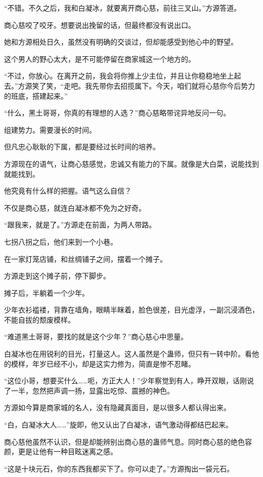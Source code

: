 \begin{this_body}
“不错。不久之后，我和白凝冰，就要离开商心慈，前往三叉山。”方源答道。

商心慈咬了咬牙。想要说出挽留的话，但最终都没有说出口。

她和方源相处日久，虽然没有明确的交谈过，但却能感受到他心中的野望。

这个男人的野心太大，是不可能停留在商家城这一个地方的。

“不过，你放心。在离开之前，我会将你推上少主位，并且让你稳稳地坐上起去。”方源笑了笑，“走吧。我先带你去招揽属下。今天，咱们就将心慈你今后势力的班底，搭建起来。”

“什么，黑土哥哥，你真的有理想的人选？”商心慈略带诧异地反问一句。

组建势力。需要漫长的时间。

但凡忠心耿耿的下属，都是要经过长时间的培养。

方源现在的语气，让商心慈感觉，忠诚又有能力的下属。就像是大白菜，说能找到就能找到。

他究竟有什么样的把握。语气这么自信？

不仅是商心慈，就连白凝冰都不免为之好奇。

“跟我来，就是了。”方源走在前面，为两人带路。

七拐八拐之后，他们来到一个小巷。

在一家灯笼店铺，和丝绸铺子之间，摆着一个摊子。

方源走到这个摊子前，停下脚步。

摊子后，半躺着一个少年。

少年衣衫褴褛，背靠在墙角，眼睛半眯着，脸色很差，目光虚浮，一副沉浸酒色，不能自拔的颓废模样。

“难道黑土哥哥，要找的就是这个少年？”商心慈心中思量。

白凝冰也在用锐利的目光，打量这人。这人虽然是个蛊师，但只有一转中阶。看他的模样，年岁已经不小，却是这实力修为，简直是惨不忍睹。

“这位小哥，想要买什么……呃，方正大人！”少年察觉到有人，睁开双眼，话刚说了一半，忽然把声调一扬，显露出吃惊、震撼的神色。

方源如今算是商家城的名人，没有隐藏真面目，是以很多人都认得出来。

“白，白凝冰大人……”旋即，他又认出了白凝冰，语气激动得都结巴起来。

商心慈他虽然不认识，但是却能辨别出商心慈的蛊师气息。同时商心慈的绝色容颜，更是让他有一种目眩迷离之感。

“这是十块元石，你的东西我都买下了。你可以走了。”方源掏出一袋元石。


\end{this_body}
